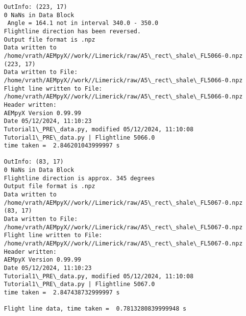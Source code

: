 \documentclass[11pt]{article}
\begin{document}
\begin{Verbatim}[commandchars=\\\{\}]
OutInfo: (223, 17)
0 NaNs in Data Block
 Angle = 164.1 not in interval 340.0 - 350.0
Flightline direction has been reversed.
Output file format is .npz
Data written to
/home/vrath/AEMpyX//work//Limerick/raw/A5\_rect\_shale\_FL5066-0.npz
(223, 17)
Data written to File:
/home/vrath/AEMpyX//work//Limerick/raw/A5\_rect\_shale\_FL5066-0.npz
Flight line written to File:
/home/vrath/AEMpyX//work//Limerick/raw/A5\_rect\_shale\_FL5066-0.npz
Header written:
AEMpyX Version 0.99.99
Date 05/12/2024, 11:10:23
Tutorial1\_PRE\_data.py, modified 05/12/2024, 11:10:08
Tutorial1\_PRE\_data.py | Flightline 5066.0
time taken =  2.846201043999997 s

OutInfo: (83, 17)
0 NaNs in Data Block
Flightline direction is approx. 345 degrees
Output file format is .npz
Data written to
/home/vrath/AEMpyX//work//Limerick/raw/A5\_rect\_shale\_FL5067-0.npz
(83, 17)
Data written to File:
/home/vrath/AEMpyX//work//Limerick/raw/A5\_rect\_shale\_FL5067-0.npz
Flight line written to File:
/home/vrath/AEMpyX//work//Limerick/raw/A5\_rect\_shale\_FL5067-0.npz
Header written:
AEMpyX Version 0.99.99
Date 05/12/2024, 11:10:23
Tutorial1\_PRE\_data.py, modified 05/12/2024, 11:10:08
Tutorial1\_PRE\_data.py | Flightline 5067.0
time taken =  2.847438732999997 s

Flight line data, time taken =  0.7813280839999948 s

    \end{Verbatim}


    
    
    
\end{document}

